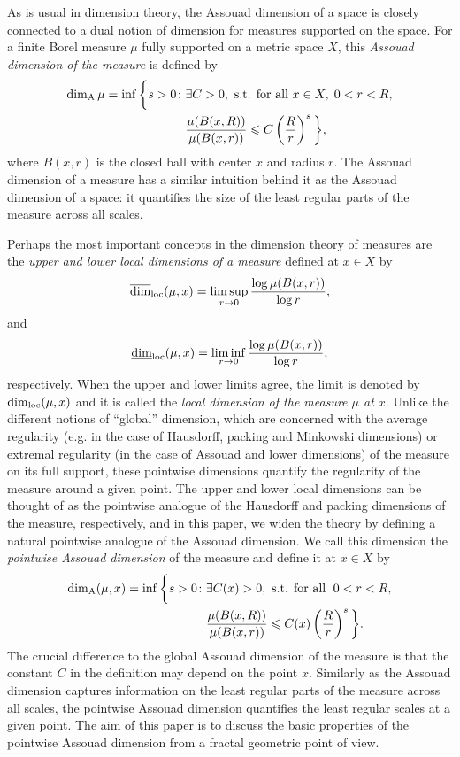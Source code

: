 \documentclass{PRM}
\newcommand{\updim}{\overline{\dim}}
\newcommand{\lowdim}{\underline{\dim}}
\newcommand{\adim}{\dim_{\mathrm{A}}}
\theoremstyle{plain}
\theoremstyle{definition}
\theoremstyle{remark}
\begin{document}
As is usual in dimension theory, the Assouad dimension of a space is closely connected to a dual notion of dimension for measures supported on the space. For a finite Borel measure $\mu$ fully supported on a metric space $X$, this \emph{Assouad dimension of the measure} is defined by
\begin{align}\label{eq:global_assouad}
    \adim \mu=\inf\bigg\{ s>0\colon& \exists C>0,\textnormal{ s.t. for all }x\in X,\; 0<r<R,\nonumber\\
    &\frac{\mu(B(x,R))}{\mu(B(x,r))}\leq C\left(\frac{R}{r}\right)^s\bigg\},
\end{align}
where $B(x,r)$ is the closed ball with center $x$ and radius $r$. The Assouad dimension of a measure has a similar intuition behind it as the Assouad dimension of a space: it quantifies the size of the least regular parts of the measure across all scales. 

Perhaps the most important concepts in the dimension theory of measures are the \emph{upper and lower local dimensions of a measure} defined at $x\in X$ by
\begin{equation*}
    \updim_{\textnormal{loc}}(\mu,x)=\limsup_{r\to 0}\frac{\log \mu(B(x,r))}{\log r},
\end{equation*}
and
\begin{equation*}
    \lowdim_{\textnormal{loc}}(\mu,x)=\liminf_{r\to 0}\frac{\log \mu(B(x,r))}{\log r},
\end{equation*}
respectively. When the upper and lower limits agree, the limit is denoted by $\dim_{\textnormal{loc}}(\mu,x)$ and it is called the \emph{local dimension of the measure $\mu$ at $x$}. Unlike the different notions of ``global'' dimension, which are concerned with the average regularity (e.g. in the case of Hausdorff, packing and Minkowski dimensions) or extremal regularity (in the case of Assouad and lower dimensions) of the measure on its full support, these pointwise dimensions quantify the regularity of the measure around a given point. The upper and lower local dimensions can be thought of as the pointwise analogue of the Hausdorff and packing dimensions of the measure, respectively, and in this paper, we widen the theory by defining a natural pointwise analogue of the Assouad dimension. We call this dimension the \emph{pointwise Assouad dimension} of the measure and define it at $x\in X$ by
\begin{align*}
    \adim (\mu,x)=\inf\bigg\{ s>0\colon& \exists C(x)>0,\textnormal{ s.t. for all }\; 0<r<R,\\
    &\frac{\mu(B(x,R))}{\mu(B(x,r))}\leq C(x)\left(\frac{R}{r}\right)^s\bigg\}.
\end{align*}
The crucial difference to the global Assouad dimension of the measure is that the constant $C$ in the definition may depend on the point $x$. Similarly as the Assouad dimension captures information on the least regular parts of the measure across all scales, the pointwise Assouad dimension quantifies the least regular scales at a given point. The aim of this paper is to discuss the basic properties of the pointwise Assouad dimension from a fractal geometric point of view.
\end{document}
